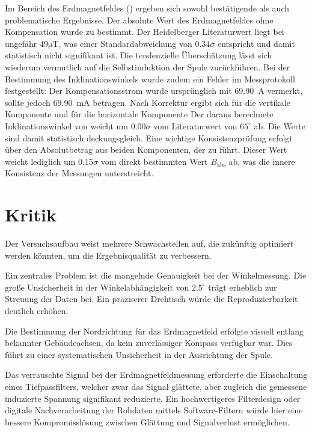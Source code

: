 Im Bereich des Erdmagnetfeldes () ergeben sich sowohl bestätigende als auch problematische Ergebnisse. Der absolute Wert des Erdmagnetfeldes ohne Kompensation wurde zu  bestimmt. Der Heidelberger Literaturwert liegt bei ungefähr $49\mathrm{\mu T}$, was einer Standardabweichung von $0.34\sigma$ entspricht und damit statistisch nicht signifikant ist. Die tendenzielle Überschätzung lässt sich wiederum vermutlich auf die Selbstinduktion der Spule zurückführen.
Bei der Bestimmung des Inklinationswinkels wurde zudem ein Fehler im Messprotokoll festgestellt: Der Kompensationsstrom wurde ursprünglich mit \SI{69.90}{\ampere} vermerkt, sollte jedoch \SI{69.90}{\milli\ampere} betragen. Nach Korrektur ergibt sich für die vertikale Komponente 
und für die horizontale Komponente 
Der daraus berechnete Inklinationswinkel von 
weicht um $0.00\sigma$ vom Literaturwert von $65^\circ$ ab. Die Werte sind damit statistisch deckungsgleich. Eine wichtige Konsistenzprüfung erfolgt über den Absolutbetrag aus beiden Komponenten, der zu 
führt. Dieser Wert weicht lediglich um $0.15\sigma$ vom direkt bestimmten Wert $B_\text{abs}$ ab, was die innere Konsistenz der Messungen unterstreicht.

\section{Kritik}
\label{sec:Kritik}
Der Versuchsaufbau weist mehrere Schwachstellen auf, die zukünftig optimiert werden könnten, um die Ergebnisqualität zu verbessern.

Ein zentrales Problem ist die mangelnde Genauigkeit bei der Winkelmessung. Die große Unsicherheit in der Winkelabhängigkeit von $2.5^\circ$ trägt erheblich zur Streuung der Daten bei. Ein präziserer Drehtisch würde die Reproduzierbarkeit deutlich erhöhen.

Die Bestimmung der Nordrichtung für das Erdmagnetfeld erfolgte visuell entlang bekannter Gebäudeachsen, da kein zuverlässiger Kompass verfügbar war. Dies führt zu einer systematischen Unsicherheit in der Ausrichtung der Spule.

Das verrauschte Signal bei der Erdmagnetfeldmessung erforderte die Einschaltung eines Tiefpassfilters, welcher zwar das Signal glättete, aber zugleich die gemessene induzierte Spannung signifikant reduzierte. Ein hochwertigeres Filterdesign oder digitale Nachverarbeitung der Rohdaten mittels Software-Filtern würde hier eine bessere Kompromisslösung zwischen Glättung und Signalverlust ermöglichen.

